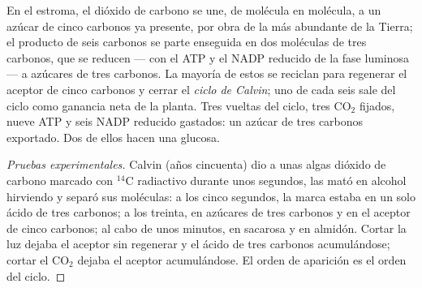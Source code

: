 \begin{proposition}\label{prop:g12:photosynthesis:calvin}
En el estroma, el dióxido de carbono se une, de molécula en molécula, a
un azúcar de cinco carbonos ya presente, por obra de la  más
abundante de la Tierra; el producto de seis carbonos se parte enseguida
en dos moléculas de tres carbonos, que se reducen --- con el ATP y el
NADP reducido de la fase luminosa --- a azúcares de tres carbonos. La
mayoría de estos se reciclan para regenerar el aceptor de cinco
carbonos y cerrar el \emph{ciclo de Calvin};
uno de cada seis sale del ciclo como ganancia neta de la planta. Tres
vueltas del ciclo, tres $\mathrm{CO_2}$ fijados, nueve ATP y seis NADP
reducido gastados: un azúcar de tres carbonos exportado. Dos de ellos
hacen una glucosa.
\end{proposition}
\begin{proof}[Pruebas experimentales]
Calvin (años cincuenta) dio a unas algas dióxido de carbono marcado con
$^{14}$C radiactivo durante unos segundos, las mató en alcohol
hirviendo y separó sus moléculas: a los cinco segundos, la marca estaba
en un solo ácido de tres carbonos; a los treinta, en azúcares de tres
carbonos y en el aceptor de cinco carbonos; al cabo de unos minutos, en
sacarosa y en almidón. Cortar la luz dejaba el aceptor sin regenerar y
el ácido de tres carbonos acumulándose; cortar el $\mathrm{CO_2}$
dejaba el aceptor acumulándose. El orden de aparición es el orden del
ciclo.
\end{proof}

